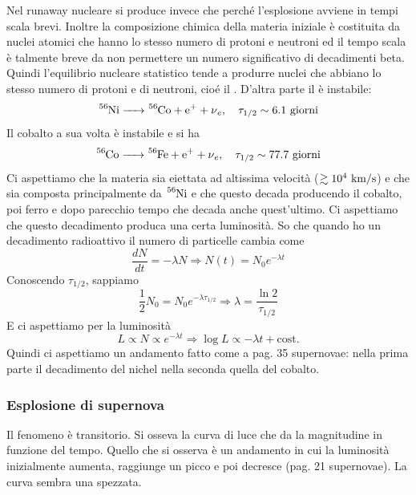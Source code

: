 Nel runaway nucleare si produce  invece che  perché l'esplosione avviene in tempi scala brevi. Inoltre la composizione chimica della materia iniziale è costituita da nuclei atomici che hanno lo stesso numero di protoni e neutroni ed il tempo scala è talmente breve da non permettere un numero significativo di decadimenti beta. Quindi l'equilibrio nucleare statistico tende a produrre nuclei che abbiano lo stesso numero di protoni e di neutroni, cioé il . D'altra parte il  è instabile:
\begin{equation*}
    \ce{{}^{56}Ni -> {}^{56}Co + e+ + \nu_e}, \quad \tau_{1/2}\sim 6.1 \um{giorni}
\end{equation*}
Il cobalto a sua volta è instabile e si ha 
\begin{equation*}
    \ce{{}^{56}Co -> {}^{56}Fe + e+ + \nu_e}, \quad \tau_{1/2}\sim 77.7\um{giorni}
\end{equation*}
Ci aspettiamo che la materia sia eiettata ad altissima velocità ($\gtrsim 10^4\text{ km/s}$) e che sia composta principalmente da $\ce{^{56}Ni}$ e che questo decada producendo il cobalto, poi ferro e dopo parecchio tempo che decada anche quest'ultimo. Ci aspettiamo che questo decadimento produca una certa luminosità. So che quando ho un decadimento radioattivo il numero di particelle cambia come
\[ \frac{dN}{dt}=-\lambda N\Rightarrow N(t)=N_0e^{-\lambda t}\]
Conoscendo $\tau_{1/2}$, sappiamo
\[
    \frac{1}{2}N_0=N_0e^{-\lambda \tau_{1/2}} \Rightarrow \lambda = \frac{\ln 2}{\tau_{1/2}}
\]
E ci aspettiamo per la luminosità
\[
    L \propto N \propto e^{-\lambda t} \Rightarrow \log L \propto -\lambda t + \text{cost.}
\]
Quindi ci aspettiamo un andamento fatto come a pag. 35 supernovae: nella prima parte il decadimento del nichel nella seconda quella del cobalto.
\subsubsection*{Esplosione di supernova}
Il fenomeno è transitorio.  Si osseva la curva di luce che da la magnitudine in funzione del tempo. Quello che si osserva è un andamento in cui la luminosità inizialmente aumenta, raggiunge un picco e poi decresce (pag. 21 supernovae). La curva sembra una spezzata.
